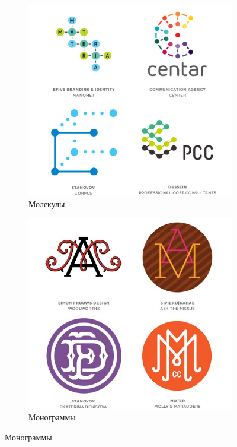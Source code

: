 \begin{figure}[h!]
  \ContinuedFloat
  \centering
  \begin{subfigure}{.45\textwidth}
    \centering
    \includegraphics[width=\linewidth]{images/supplement/logolounge/2013/Molekuli}
    \caption{Молекулы}
    \label{fig:logolounge:2013:moleculi}
  \end{subfigure}
  \hfill
  \centering
  \begin{subfigure}{.45\textwidth}
    \centering
    \includegraphics[width=\linewidth]{images/supplement/logolounge/2013/Monogrammi}
    \caption{Монограммы}
    \label{fig:logolounge:2013:Monogrammi}
  \end{subfigure}


\end{figure}
